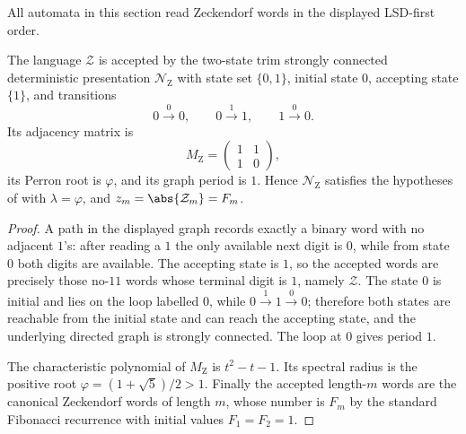 All automata in this section read Zeckendorf words in the displayed
LSD-first order.

\begin{lemma}
  \label{lem:zeckendorf-canonical-presentation}
  The language \(\mathcal Z\) is accepted by the two-state trim
  strongly connected deterministic presentation \(\mathcal N_{\mathrm Z}\)
  with state set \(\{0,1\}\), initial state \(0\), accepting state
  \(\{1\}\), and transitions
  \[
    0\xrightarrow{0}0,\qquad
    0\xrightarrow{1}1,\qquad
    1\xrightarrow{0}0.
  \]
  Its adjacency matrix is
  \[
    M_{\mathrm Z}=
    \begin{pmatrix}
      1&1\\
      1&0
    \end{pmatrix},
  \]
  its Perron root is \(\varphi\), and its graph period is \(1\). Hence
  \(\mathcal N_{\mathrm Z}\) satisfies the hypotheses of
   with \(\lambda=\varphi\), and
  \(z_m=\abs{\mathcal Z_m}=F_m\).
\end{lemma}

\begin{proof}
  A path in the displayed graph records exactly a binary word with no
  adjacent \(1\)'s: after reading a \(1\) the only available next digit
  is \(0\), while from state \(0\) both digits are available. The
  accepting state is \(1\), so the accepted words are precisely those
  no-\(11\) words whose terminal digit is \(1\), namely
  \(\mathcal Z\). The state \(0\) is initial and lies on the loop
  labelled \(0\), while \(0\xrightarrow{1}1\xrightarrow{0}0\); therefore
  both states are reachable from the initial state and can reach the
  accepting state, and the underlying directed graph is strongly
  connected. The loop at \(0\) gives period \(1\).

  The characteristic polynomial of \(M_{\mathrm Z}\) is
  \(t^2-t-1\). Its spectral radius is the positive root
  \(\varphi=(1+\sqrt5)/2>1\). Finally the accepted length-\(m\) words
  are the canonical Zeckendorf words of length \(m\), whose number is
  \(F_m\) by the standard Fibonacci recurrence with initial values
  \(F_1=F_2=1\).
\end{proof}
